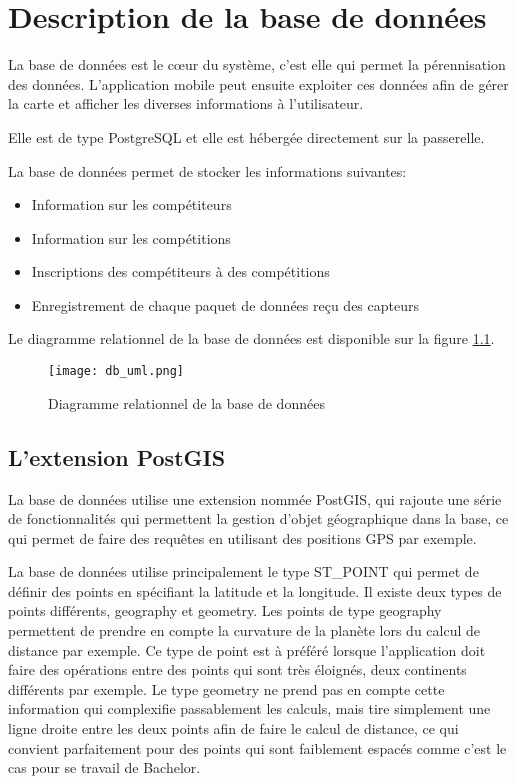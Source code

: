 \chapter{Description de la base de données}\label{ch:bd}

La base de données est le cœur du système, c'est elle qui permet la pérennisation des données. L'application mobile peut ensuite exploiter ces données afin de gérer la carte et afficher les diverses informations à l'utilisateur.

Elle est de type PostgreSQL et elle est hébergée directement sur la passerelle.

La base de données permet de stocker les informations suivantes:

\begin{itemize}
\item Information sur les compétiteurs
\item Information sur les compétitions
\item Inscriptions des compétiteurs à des compétitions
\item Enregistrement de chaque paquet de données reçu des capteurs
\end{itemize}

Le diagramme relationnel de la base de données est disponible sur la figure \ref{fig:db_uml}.

\begin{figure}[htb]
\centering 
\texttt{[image: db\_uml.png]} 
\caption{Diagramme relationnel de la base de données}
\label{fig:db_uml}
 \end{figure}

\section{L'extension PostGIS}

La base de données utilise une extension nommée PostGIS, qui rajoute une série de fonctionnalités qui permettent la gestion d'objet géographique dans la base, ce qui permet de faire des requêtes en utilisant des positions GPS par exemple.

La base de données utilise principalement le type ST\_POINT qui permet de définir des points en spécifiant la latitude et la longitude. Il existe deux types de points différents, geography et geometry. Les points de type geography permettent de prendre en compte la curvature de la planète lors du calcul de distance par exemple. Ce type de point est à préféré lorsque l'application doit faire des opérations entre des points qui sont très éloignés, deux continents différents par exemple. Le type geometry ne prend pas en compte cette information qui complexifie passablement les calculs, mais tire simplement une ligne droite entre les deux points afin de faire le calcul de distance, ce qui convient parfaitement pour des points qui sont faiblement espacés comme c'est le cas pour se travail de Bachelor.

